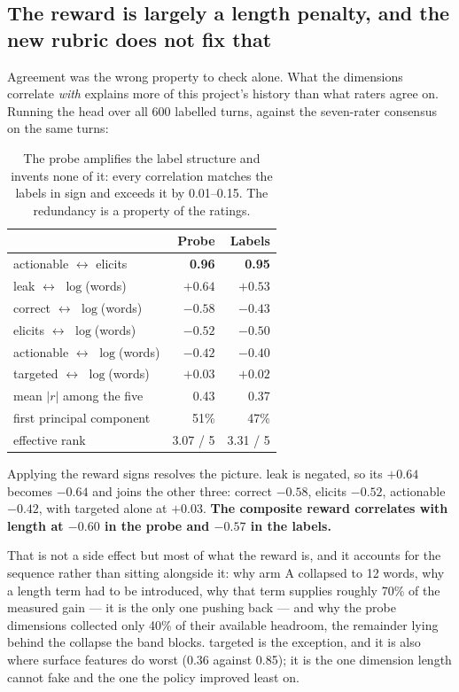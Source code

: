 \documentclass[11pt]{article}
\newcommand{\qual}[1]{\textsf{#1}}
\begin{document}
\subsection{The reward is largely a length penalty, and the new rubric does not fix that}

Agreement was the wrong property to check alone. What the dimensions correlate \emph{with} explains
more of this project's history than what raters agree on. Running the head over all 600 labelled turns,
against the seven-rater consensus on the same turns:

\begin{table}[h]
\centering
\begin{tabular}{lrr}
\toprule
& \textbf{Probe} & \textbf{Labels} \\
\midrule
\qual{actionable} $\leftrightarrow$ \qual{elicits} & \textbf{0.96} & \textbf{0.95} \\
\qual{leak} $\leftrightarrow$ $\log$(words) & $+0.64$ & $+0.53$ \\
\qual{correct} $\leftrightarrow$ $\log$(words) & $-0.58$ & $-0.43$ \\
\qual{elicits} $\leftrightarrow$ $\log$(words) & $-0.52$ & $-0.50$ \\
\qual{actionable} $\leftrightarrow$ $\log$(words) & $-0.42$ & $-0.40$ \\
\qual{targeted} $\leftrightarrow$ $\log$(words) & $\mathbf{+0.03}$ & $\mathbf{+0.02}$ \\
\midrule
mean $|r|$ among the five & 0.43 & 0.37 \\
first principal component & 51\% & 47\% \\
effective rank & 3.07 / 5 & 3.31 / 5 \\
\bottomrule
\end{tabular}
\caption{The probe amplifies the label structure and invents none of it: every correlation matches the
labels in sign and exceeds it by 0.01--0.15. The redundancy is a property of the ratings.}
\label{tab:corr}
\end{table}

Applying the reward signs resolves the picture. \qual{leak} is negated, so its $+0.64$ becomes $-0.64$
and joins the other three: \qual{correct} $-0.58$, \qual{elicits} $-0.52$, \qual{actionable} $-0.42$,
with \qual{targeted} alone at $+0.03$. \textbf{The composite reward correlates with length at $-0.60$
in the probe and $-0.57$ in the labels.}

That is not a side effect but most of what the reward is, and it accounts for the sequence rather than
sitting alongside it: why arm A collapsed to 12 words, why a length term had to be introduced, why that
term supplies roughly 70\% of the measured gain --- it is the only one pushing back --- and why the
probe dimensions collected only 40\% of their available headroom, the remainder lying behind the
collapse the band blocks. \qual{targeted} is the exception, and it is also where surface features do
worst (0.36 against 0.85); it is the one dimension length cannot fake and the one the policy improved
least on.
\end{document}
